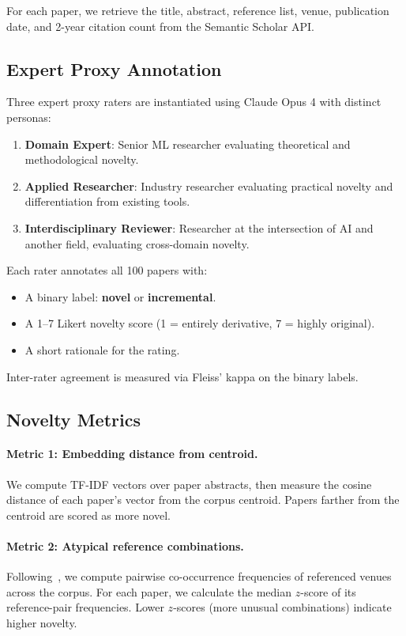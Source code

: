 \documentclass[11pt,a4paper]{article}
\begin{document}
For each paper, we retrieve the title, abstract, reference list,
venue, publication date, and 2-year citation count from the Semantic
Scholar API.

\subsection{Expert Proxy Annotation}
\label{sec:annotation}

Three expert proxy raters are instantiated using Claude Opus 4 with
distinct personas:

\begin{enumerate}
  \item \textbf{Domain Expert}: Senior ML researcher evaluating
        theoretical and methodological novelty.
  \item \textbf{Applied Researcher}: Industry researcher evaluating
        practical novelty and differentiation from existing tools.
  \item \textbf{Interdisciplinary Reviewer}: Researcher at the
        intersection of AI and another field, evaluating cross-domain
        novelty.
\end{enumerate}

Each rater annotates all 100 papers with:
\begin{itemize}
  \item A binary label: \textbf{novel} or \textbf{incremental}.
  \item A 1--7 Likert novelty score (1 = entirely derivative,
        7 = highly original).
  \item A short rationale for the rating.
\end{itemize}

Inter-rater agreement is measured via Fleiss' kappa on the binary
labels.

\subsection{Novelty Metrics}
\label{sec:metrics}

\paragraph{Metric 1: Embedding distance from centroid.}
We compute TF-IDF vectors over paper abstracts, then measure the cosine
distance of each paper's vector from the corpus centroid.  Papers farther
from the centroid are scored as more novel.

\paragraph{Metric 2: Atypical reference combinations.}
Following~\citet{uzzi2013atypical}, we compute pairwise co-occurrence
frequencies of referenced venues across the corpus.  For each paper, we
calculate the median $z$-score of its reference-pair frequencies.  Lower
$z$-scores (more unusual combinations) indicate higher novelty.
\end{document}
